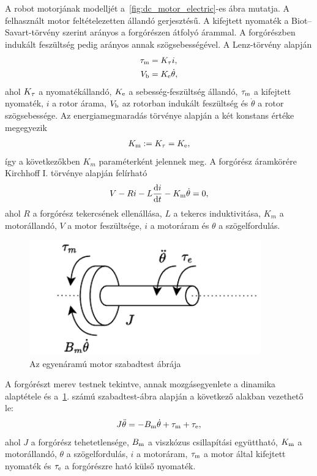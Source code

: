A robot motorjának modelljét a~\ref{fig:dc_motor_electric}-es ábra mutatja. A felhasznált motor feltételezetten állandó gerjesztésű. A kifejtett nyomaték 
a Biot--Savart-törvény szerint arányos a forgórészen átfolyó árammal. A forgórészben
indukált feszültség pedig arányos annak szögsebességével. A Lenz-törvény alapján 
\begin{equation}
\begin{split}
    \tau_{\mathrm{m}} &= K_{\mathrm{\tau}} i, \\
    V_{\mathrm{b}} &= K_{\mathrm{e}} \dot\theta,
\end{split}
\end{equation}
ahol $K_{\mathrm{\tau}}$ a nyomatékállandó, $K_{\mathrm{e}}$ a sebesség-feszültség állandó, $\tau_{\mathrm{m}}$ a kifejtett 
nyomaték, $i$ a rotor árama, $V_{\mathrm{b}}$ az rotorban indukált feszültség és $\dot\theta$ a rotor szögsebessége.
Az energiamegmaradás törvénye alapján a két konstans értéke megegyezik
\begin{align}
    K_{\mathrm{m}} := K_{\mathrm{\tau}} = K_{\mathrm{e}},
\end{align}
így a következőkben $K_m$ paraméterként jelennek meg. A forgórész áramkörére Kirchhoff I. törvénye alapján felírható
\begin{align}\label{eq:armature_circuit}
    V - Ri - L\frac{\mathrm{d} i}{\mathrm{d} t} - K_{\mathrm{m}}\dot\theta = 0,
\end{align}
ahol $R$ a forgórész tekercsének ellenállása, $L$ a tekercs induktivitása, 
$K_m$ a motorállandó, $V$ a motor feszültsége, $i$ a motoráram és $\theta$ a szögelfordulás.
\begin{figure}[h]
    \begin{center}
    \includegraphics[width=10cm]{images/motor_model_mechanical.pdf}
    \caption{Az egyenáramú motor szabadtest ábrája}
    \label{fig:dc_motor_mechanical}
    \end{center}
\end{figure}
A forgórészt merev testnek tekintve, annak mozgásegyenlete a dinamika alaptétele és a~\ref{fig:dc_motor_mechanical}. számú 
szabadtest-ábra alapján a következő alakban vezethető le:
\begin{align}\label{eq:rotor_dynamics}
    J\ddot\theta = -B_{\mathrm{m}}\dot\theta + \tau_{\mathrm{m}} + \tau_{\mathrm{e}},
\end{align}
ahol $J$ a forgórész tehetetlensége, $B_{\mathrm{m}}$ a viszkózus csillapítási együttható, 
$K_{\mathrm{m}}$ a motorállandó, $\theta$ a szögelfordulás, $i$ a motoráram, $\tau_{\mathrm{m}}$ a motor által kifejtett nyomaték 
és $\tau_{\mathrm{e}}$ a forgórészre ható külső nyomaték. 
    
